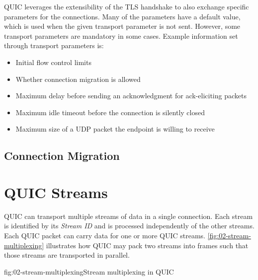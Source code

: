 QUIC leverages the extensibility of the TLS handshake to also exchange specific parameters for the
connections. Many of the parameters have a default value, which is used when the given transport
parameter is not sent. However, some transport parameters are mandatory in some cases. Example
information set through transport parameters is:

\begin{itemize}

  \item Initial flow control limits

  \item Whether connection migration is allowed

  \item Maximum delay before sending an acknowledgment for ack-eliciting packets

  \item Maximum idle timeout before the connection is silently closed

  \item Maximum size of a UDP packet the endpoint is willing to receive

\end{itemize}



\subsection{Connection Migration}


\section{QUIC Streams}

QUIC can transport multiple streams of data in a single connection. Each stream is identified by its
\textit{Stream ID} and is processed independently of the other streams. Each QUIC packet can carry
data for one or more QUIC streams. \autoref{fig:02-stream-multiplexing} illustrates how QUIC may
pack two streams into frames such that those streams are transported in parallel.

\begin{myFigure}{fig:02-stream-multiplexing}{Stream multiplexing in QUIC}

  

\end{myFigure}

